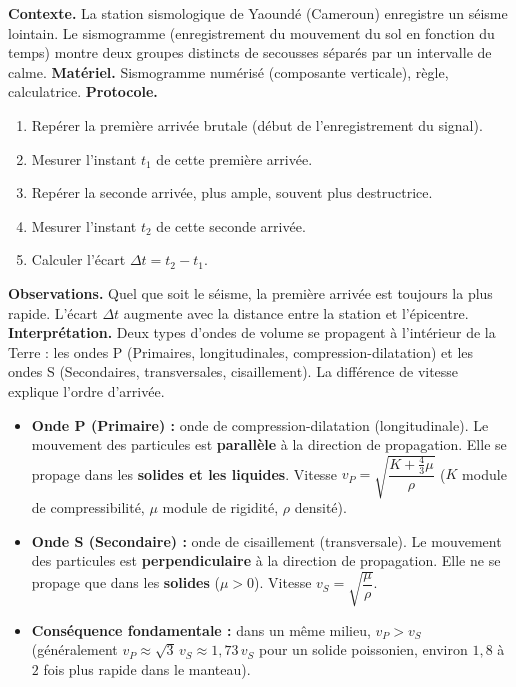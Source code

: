 \documentclass[11pt]{article}
\newcommand{\cle}[1]{{\popxbold\color{popdark}#1}}
\begin{document}
\begin{experience}
\textbf{Contexte.} La station sismologique de Yaoundé (Cameroun) enregistre un séisme lointain. Le sismogramme (enregistrement du mouvement du sol en fonction du temps) montre deux groupes distincts de secousses séparés par un intervalle de calme.
\textbf{Matériel.} Sismogramme numérisé (composante verticale), règle, calculatrice.
\textbf{Protocole.}
\begin{enumerate}
\item Repérer la première arrivée brutale (début de l'enregistrement du signal).
\item Mesurer l'instant $t_1$ de cette première arrivée.
\item Repérer la seconde arrivée, plus ample, souvent plus destructrice.
\item Mesurer l'instant $t_2$ de cette seconde arrivée.
\item Calculer l'écart $\Delta t = t_2 - t_1$.
\end{enumerate}
\textbf{Observations.} Quel que soit le séisme, la première arrivée est toujours la plus rapide. L'écart $\Delta t$ augmente avec la distance entre la station et l'épicentre.
\textbf{Interprétation.} Deux types d'ondes de volume se propagent à l'intérieur de la Terre : les \cle{ondes P} (Primaires, longitudinales, compression-dilatation) et les \cle{ondes S} (Secondaires, transversales, cisaillement). La différence de vitesse explique l'ordre d'arrivée.
\end{experience}

\begin{definition}
\begin{itemize}
\item \textbf{Onde P (Primaire) :} onde de \cle{compression-dilatation} (longitudinale). Le mouvement des particules est \textbf{parallèle} à la direction de propagation. Elle se propage dans les \textbf{solides et les liquides}. Vitesse $v_P = \sqrt{\dfrac{K + \frac{4}{3}\mu}{\rho}}$ ($K$ module de compressibilité, $\mu$ module de rigidité, $\rho$ densité).
\item \textbf{Onde S (Secondaire) :} onde de \cle{cisaillement} (transversale). Le mouvement des particules est \textbf{perpendiculaire} à la direction de propagation. Elle ne se propage que dans les \textbf{solides} ($\mu > 0$). Vitesse $v_S = \sqrt{\dfrac{\mu}{\rho}}$.
\item \textbf{Conséquence fondamentale :} dans un même milieu, $v_P > v_S$ (généralement $v_P \approx \sqrt{3}\,v_S \approx 1{,}73\,v_S$ pour un solide poissonien, environ $1{,}8$ à $2$ fois plus rapide dans le manteau).
\end{itemize}
\end{definition}
\end{document}
